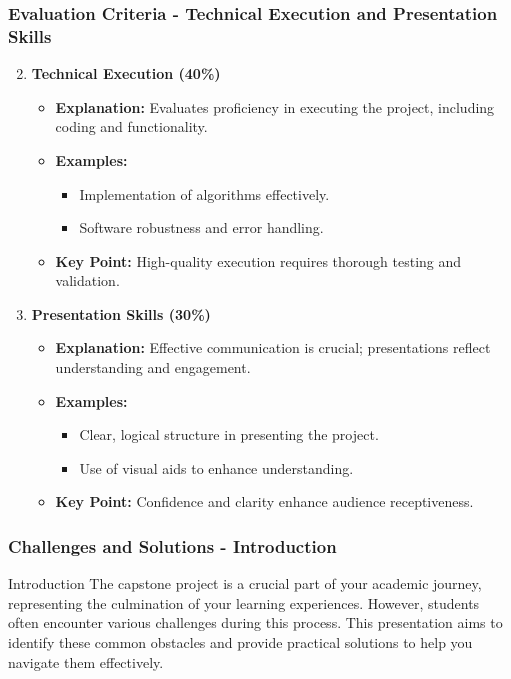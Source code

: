 \documentclass[aspectratio=169]{beamer}
\begin{document}
\begin{frame}[fragile]
    \frametitle{Evaluation Criteria - Technical Execution and Presentation Skills}
    \begin{enumerate}
        \setcounter{enumi}{1}
        \item \textbf{Technical Execution (40\%)} 
            \begin{itemize}
                \item \textbf{Explanation:} Evaluates proficiency in executing the project, including coding and functionality.
                \item \textbf{Examples:} 
                    \begin{itemize}
                        \item Implementation of algorithms effectively.
                        \item Software robustness and error handling.
                    \end{itemize}
                \item \textbf{Key Point:} High-quality execution requires thorough testing and validation.
            \end{itemize}

        \item \textbf{Presentation Skills (30\%)} 
            \begin{itemize}
                \item \textbf{Explanation:} Effective communication is crucial; presentations reflect understanding and engagement.
                \item \textbf{Examples:} 
                    \begin{itemize}
                        \item Clear, logical structure in presenting the project.
                        \item Use of visual aids to enhance understanding.
                    \end{itemize}
                \item \textbf{Key Point:} Confidence and clarity enhance audience receptiveness.
            \end{itemize}
    \end{enumerate}
\end{frame}

\begin{frame}[fragile]
    \frametitle{Challenges and Solutions - Introduction}
    \begin{block}{Introduction}
        The capstone project is a crucial part of your academic journey, representing the culmination of your learning experiences. 
        However, students often encounter various challenges during this process. 
        This presentation aims to identify these common obstacles and provide practical solutions to help you navigate them effectively.
    \end{block}
\end{frame}
\end{document}
